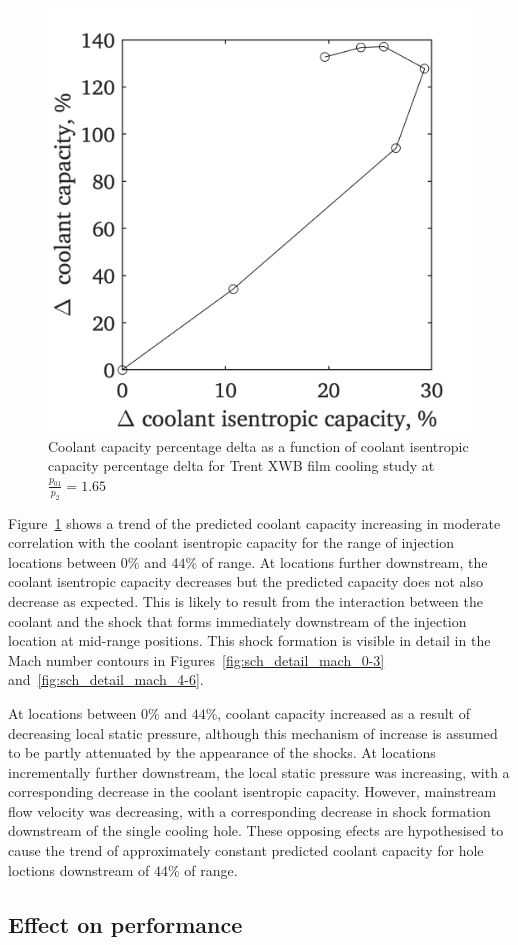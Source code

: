 \documentclass[a4paper, 11pt, oneside]{report}
\begin{document}
\begin{figure}[H]
      \centering
      \includegraphics[width=.45\textwidth]{figs/sch_coolant_isentropic_capacity_vs_coolant_capacity.png}
      \caption{Coolant capacity percentage delta as a function of coolant isentropic capacity percentage delta for Trent XWB film cooling study at $\frac{p_{01}}{p_2}=1.65$}
      \label{fig:sch_coolant_isentropic_capacity_vs_coolant_capacity}
\end{figure}

Figure~\ref{fig:sch_coolant_isentropic_capacity_vs_coolant_capacity} shows a trend of the predicted coolant capacity increasing in moderate correlation with the coolant isentropic capacity for the range of injection locations between $0\%$ and $44\%$ of range. At locations further downstream, the coolant isentropic capacity decreases but the predicted capacity does not also decrease as expected. This is likely to result from the interaction between the coolant and the shock that forms immediately downstream of the injection location at mid-range positions. This shock formation is visible in detail in the Mach number contours in Figures~\ref{fig:sch_detail_mach_0-3} and~\ref{fig:sch_detail_mach_4-6}. 

At locations between $0\%$ and $44\%$, coolant capacity increased as a result of decreasing local static pressure, although this mechanism of increase is assumed to be partly attenuated by the appearance of the shocks. At locations incrementally further downstream, the local static pressure was increasing, with a corresponding decrease in the coolant isentropic capacity. However, mainstream flow velocity was decreasing, with a corresponding decrease in shock formation downstream of the single cooling hole. These opposing efects are hypothesised to cause the trend of approximately constant predicted coolant capacity for hole loctions downstream of $44\%$ of range.

\subsection{Effect on performance}
    
\end{document}
